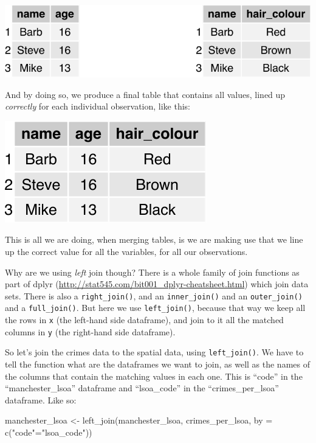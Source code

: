 \documentclass[
]{book}
\newenvironment{Shaded}{\begin{snugshade}}{\end{snugshade}}
\newcommand{\AttributeTok}[1]{\textcolor[rgb]{0.77,0.63,0.00}{#1}}
\newcommand{\FunctionTok}[1]{\textcolor[rgb]{0.00,0.00,0.00}{#1}}
\newcommand{\NormalTok}[1]{#1}
\newcommand{\OtherTok}[1]{\textcolor[rgb]{0.56,0.35,0.01}{#1}}
\newcommand{\StringTok}[1]{\textcolor[rgb]{0.31,0.60,0.02}{#1}}
\begin{document}
\includegraphics{crime_mapping_files/figure-latex/unnamed-chunk-26-1.pdf}

And by doing so, we produce a final table that contains all values, lined up \emph{correctly} for each individual observation, like this:

\includegraphics{crime_mapping_files/figure-latex/unnamed-chunk-27-1.pdf}

This is all we are doing, when merging tables, is we are making use that we line up the correct value for all the variables, for all our observations.

Why are we using \emph{left} join though? There is a whole family of join functions as part of dplyr (\url{http://stat545.com/bit001_dplyr-cheatsheet.html}) which join data sets. There is also a \texttt{right\_join()}, and an \texttt{inner\_join()} and an \texttt{outer\_join()} and a \texttt{full\_join()}. But here we use \texttt{left\_join()}, because that way we keep all the rows in \texttt{x} (the left-hand side dataframe), and join to it all the matched columns in \texttt{y} (the right-hand side dataframe).

So let's join the crimes data to the spatial data, using \texttt{left\_join()}. We have to tell the function what are the dataframes we want to join, as well as the names of the columns that contain the matching values in each one. This is ``code'' in the ``manchester\_lsoa'' dataframe and ``lsoa\_code'' in the ``crimes\_per\_lsoa'' dataframe. Like so:

\begin{Shaded}
\begin{Highlighting}[]
\NormalTok{manchester\_lsoa }\OtherTok{\textless{}{-}} \FunctionTok{left\_join}\NormalTok{(manchester\_lsoa, crimes\_per\_lsoa, }
                             \AttributeTok{by =} \FunctionTok{c}\NormalTok{(}\StringTok{"code"}\OtherTok{=}\StringTok{"lsoa\_code"}\NormalTok{))}
\end{Highlighting}
\end{Shaded}
\end{document}
